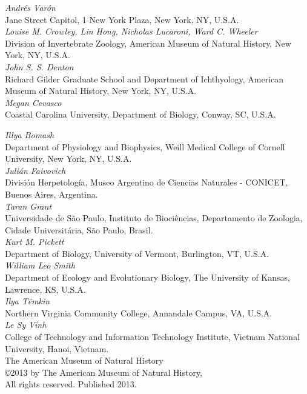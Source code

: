 \documentclass[11pt]{book}
\begin{document}
\begin{flushleft}
    \small
{\it
Andr\'es Var\'on}\\
Jane Street Capitol, 1 New York Plaza, New York, NY, U.S.A. \\
\smallskip 
{\it
Louise M. Crowley, Lin Hong, Nicholas Lucaroni, Ward C. Wheeler \\
}
Division of Invertebrate Zoology, American Museum of Natural History, New York, NY, U.S.A.\\
\smallskip
{\it
John S. S. Denton\\
}
Richard Gilder Graduate School and Department of Ichthyology, American Museum of Natural History, New York, NY, U.S.A.\\
\smallskip
{\it
Megan Cevasco} \\
Coastal Carolina University, Department of Biology, Conway, SC, U.S.A. \\
\vspace*{0.75cm}

{\it
Illya Bomash}\\
Department of Physiology and Biophysics, Weill Medical College of Cornell University, New York, NY, U.S.A.\\
\smallskip
{\it
Juli\'an Faivovich}\\
Divisi\'on Herpetolog\'ia, Museo Argentino de Ciencias Naturales - CONICET, Buenos Aires, Argentina.\\
\smallskip
{\it
Taran Grant}\\
Universidade de S\~{a}o Paulo, Instituto de Bioci\^{e}ncias, Departamento de Zoologia, Cidade Universit\'aria, 
S\~{a}o Paulo, Brasil.\\
\smallskip
{\it
Kurt M. Pickett}\\
Department of Biology, University of Vermont, Burlington, VT, U.S.A. \\
\smallskip
{\it
William Leo Smith}\\
Department of Ecology and Evolutionary Biology, The University of Kansas, Lawrence, KS, U.S.A.\\
\smallskip
{\it
Ilya T\"emkin} \\
Northern Virginia Community College, Annandale Campus, VA, U.S.A. \\
\smallskip
{\it
Le Sy Vinh}\\
College of Technology and Information Technology Institute, Vietnam National University, Hanoi, Vietnam.  \\

\vspace*{0.25cm}
The American Museum of Natural History\\
\copyright  2013 by The American Museum of Natural History, \\
All rights reserved. Published 2013.


\end{flushleft}
\end{document}
